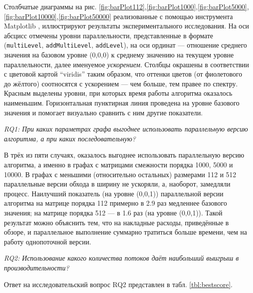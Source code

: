 Столбчатые диаграммы на рис. \ref{fig:barPlot112},\ref{fig:barPlot1000},\ref{fig:barPlot5000},\ref{fig:barPlot10000},\ref{fig:barPlot50000} реализованные с помощью инструмента Matplotlib \cite{Hunter:2007}, иллюстрируют результаты экспериментального исследования. На оси абсцисс отмечены уровни параллельности, представленные в формате (\texttt{multiLe\-vel}, \texttt{addMultiLevel}, \texttt{addLevel}), на оси ординат --- отношение среднего значения на базовом уровне (0,0,0) к среднему значению на текущем уровне параллельности, далее именуемое \textit{ускорением}. Столбцы окрашены в соответствии с цветовой картой  \enquote{viridis} таким образом, что оттенки цветов (от фиолетового до жёлтого) соотносятся с ускорением --- чем больше, тем правее по спектру. Красным выделены уровни, при которых время работы алгоритма оказалось наименьшим. Горизонтальная пунктирная линия проведена на уровне базового значения и помогает визуально сравнить с ним другие показатели.

\textit{RQ1: При каких параметрах графа выгоднее использовать параллельную версию алгоритма, а при каких последовательную?}

В трёх из пяти случаях, оказалось выгоднее использовать параллельную версию алгоритма, а именно в графах с матрицами смежности порядка 1000, 5000 и 10000. В графах с меньшими (относительно остальных) размерами 112 и 512 параллельные версии обхода в ширину не ускоряли, а, наоборот, замедляли процесс. Наилучший показатель (на уровне (0,0,1)) параллельной версии алгоритма на матрице порядка 112 примерно в 2.9 раз медленнее базового значения; на матрице порядка 512 --- в 1.6 раз (на уровне (0,0,1)). Такой результат можно объяснить тем, что на накладные расходы, приведённые в обзоре, и параллельное выполнение суммарно тратиться больше времени, чем на работу однопоточной версии.

\textit{RQ2: Использование какого количества потоков даёт наибольший выигрыш в производительности?}

Ответ на исследовательский вопрос RQ2 представлен в табл. \ref{tbl:bestscore}.

\begin{table}
\begin{center}
\caption{Уровни, дающие наибольший выигрыш}
\label{tbl:bestscore}
\end{center}
\end{table}

